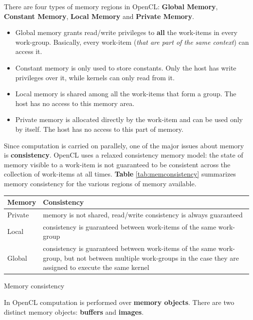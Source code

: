 There are four types of memory regions in OpenCL: \textbf{Global Memory}, \textbf{Constant Memory}, \textbf{Local Memory} and \textbf{Private Memory}.

\begin{itemize}
	\item Global memory grants read/write privileges to \textbf{all} the work-items in every work-group. Basically, every work-item (\emph{that are part of the same context}) can access it.
	\item Constant memory is only used to store constants. Only the host has write privileges over it, while kernels can only read from it.
	\item Local memory is shared among all the work-items that form a group. The host has no access to this memory area.
	\item Private memory is allocated directly by the work-item and can be used only by itself. The host has no access to this part of memory.
\end{itemize}

Since computation is carried on parallely, one of the major issues about memory is \textbf{consistency}. OpenCL uses a relaxed consistency memory model: the state of memory visible to a work-item is not guaranteed to be consistent across the collection of work-items at all times. \textbf{Table} \ref{tab:memconsistency} summarizes memory consistency for the various regions of memory available.\\

\begin{tablehere}
{\footnotesize
\begin{tabular}{|p{2cm}|p{}|} \hline
\textbf{Memory} & \textbf{Consistency}\\ \hline
Private & memory is not shared, read/write consistency is always guaranteed\\ \hline
Local & consistency is guaranteed between work-items of the same work-group\\ \hline
Global & consistency is guaranteed between work-items of the same work-group, but not between multiple work-groups in the case they are assigned to execute the same kernel\\ \hline
\end{tabular}}
\caption{Memory consistency\\}
\label{tab:memconsistency}
\end{tablehere}
In OpenCL computation is performed over \textbf{memory objects}. There are two distinct memory objects: \textbf{buffers} and \textbf{images}.

